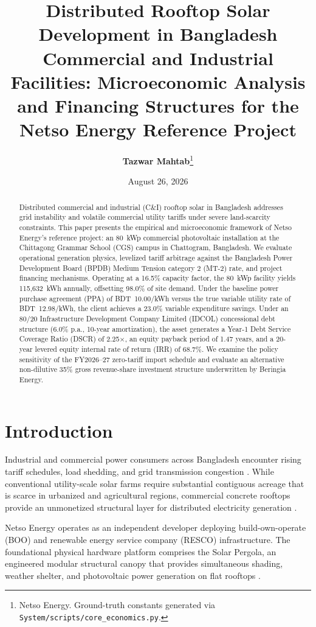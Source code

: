 \documentclass[11pt,a4paper]{article}
\title{\textbf{Distributed Rooftop Solar Development in Bangladesh Commercial and Industrial Facilities: Microeconomic Analysis and Financing Structures for the Netso Energy Reference Project}}
\author{\textbf{Tazwar Mahtab}\thanks{Netso Energy. Ground-truth constants generated via \texttt{System/scripts/core\_economics.py}.}}
\date{August 26, 2026}
\begin{document}
\maketitle

\begin{abstract}
Distributed commercial and industrial (C\&I) rooftop solar in Bangladesh addresses grid instability and volatile commercial utility tariffs under severe land-scarcity constraints. This paper presents the empirical and microeconomic framework of Netso Energy's reference project: an 80~kWp commercial photovoltaic installation at the Chittagong Grammar School (CGS) campus in Chattogram, Bangladesh. We evaluate operational generation physics, levelized tariff arbitrage against the Bangladesh Power Development Board (BPDB) Medium Tension category 2 (MT-2) rate, and project financing mechanisms. Operating at a 16.5\% capacity factor, the 80~kWp facility yields 115,632~kWh annually, offsetting 98.0\% of site demand. Under the baseline power purchase agreement (PPA) of BDT~10.00/kWh versus the true variable utility rate of BDT~12.98/kWh, the client achieves a 23.0\% variable expenditure savings. Under an 80/20 Infrastructure Development Company Limited (IDCOL) concessional debt structure (6.0\% p.a., 10-year amortization), the asset generates a Year-1 Debt Service Coverage Ratio (DSCR) of 2.25$\times$, an equity payback period of 1.47 years, and a 20-year levered equity internal rate of return (IRR) of 68.7\%. We examine the policy sensitivity of the FY2026--27 zero-tariff import schedule and evaluate an alternative non-dilutive 35\% gross revenue-share investment structure underwritten by Beringia Energy.
\end{abstract}

\section{Introduction}
Industrial and commercial power consumers across Bangladesh encounter rising tariff schedules, load shedding, and grid transmission congestion \cite{netso_product}. While conventional utility-scale solar farms require substantial contiguous acreage that is scarce in urbanized and agricultural regions, commercial concrete rooftops provide an unmonetized structural layer for distributed electricity generation \cite{netso_product}.

Netso Energy operates as an independent developer deploying build-own-operate (BOO) and renewable energy service company (RESCO) infrastructure. The foundational physical hardware platform comprises the Solar Pergola, an engineered modular structural canopy that provides simultaneous shading, weather shelter, and photovoltaic power generation on flat rooftops \cite{netso_product}.
\end{document}

